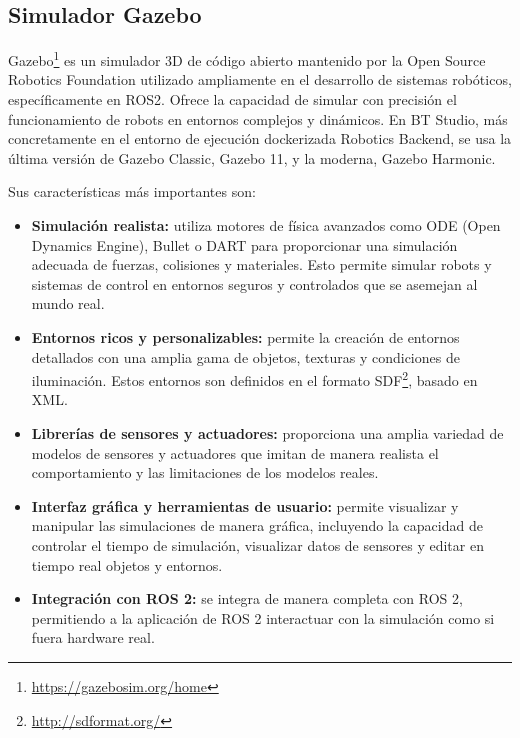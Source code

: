 \subsection{Simulador Gazebo}
\label{gazebo}

Gazebo\footnote{\url{https://gazebosim.org/home}} es un simulador 3D de código abierto mantenido por la Open Source Robotics Foundation utilizado ampliamente en el desarrollo de sistemas robóticos, específicamente en ROS2. Ofrece la capacidad de simular con precisión el funcionamiento de robots en entornos complejos y dinámicos. En BT Studio, más concretamente en el entorno de ejecución dockerizada Robotics Backend, se usa la última versión de Gazebo Classic, Gazebo 11, y la moderna, Gazebo Harmonic. 

Sus características más importantes son:

\begin{itemize}
    \item \textbf{Simulación realista:} utiliza motores de física avanzados como ODE (Open Dynamics Engine), Bullet o DART para proporcionar una simulación adecuada de fuerzas, colisiones y materiales. Esto permite simular robots y sistemas de control en entornos seguros y controlados que se asemejan al mundo real. 
    
    \item \textbf{Entornos ricos y personalizables:} permite la creación de entornos detallados con una amplia gama de objetos, texturas y condiciones de iluminación. Estos entornos son definidos en el formato SDF\footnote{\url{http://sdformat.org/}}, basado en XML. 
    
    \item \textbf{Librerías de sensores y actuadores:} proporciona una amplia variedad de modelos de sensores y actuadores que imitan de manera realista el comportamiento y las limitaciones de los modelos reales.
    
    \item \textbf{Interfaz gráfica y herramientas de usuario:} permite visualizar y manipular las simulaciones de manera gráfica, incluyendo la capacidad de controlar el tiempo de simulación, visualizar datos de sensores y editar en tiempo real objetos y entornos.
    
    \item \textbf{Integración con ROS 2:} se integra de manera completa con ROS 2, permitiendo a la aplicación de ROS 2 interactuar con la simulación como si fuera hardware real. 
\end{itemize}

